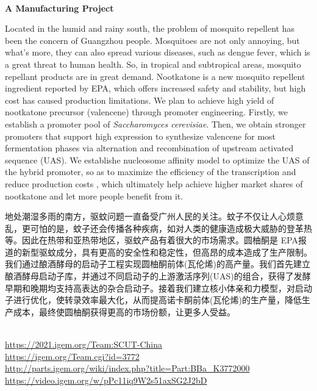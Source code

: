 \textbf{\\A Manufacturing Project\\}\begin{spacing}{1.5}

Located in the humid and rainy south, the problem of mosquito repellent has been the concern of Guangzhou people. Mosquitoes are not only annoying, but what's more, they can also spread various diseases, such as dengue fever, which is a great threat to human health. So, in tropical and subtropical areas, mosquito repellant products are in great demand. Nootkatone is a new mosquito repellent ingredient reported by EPA, which offers increased safety and stability, but high cost has caused production limitations. We plan to achieve high yield of nootkatone precursor (valencene) through promoter engineering. Firstly, we establish a promoter pool of \textit{Saccharomyces cerevisiae}. Then, we obtain stronger promoters that support high expression to synthesize valencene for most fermentation phases via alternation and recombination of upstream activated sequence (UAS). We establishe nucleosome affinity model to optimize the UAS of the hybrid promoter, so as to maximize the efficiency of the transcription and reduce production costs , which ultimately help achieve higher market shares of nootkatone and let more people benefit from it.

地处潮湿多雨的南方，驱蚊问题一直备受广州人民的关注。蚊子不仅让人心烦意乱，更可怕的是，蚊子还会传播各种疾病，如对人类的健康造成极大威胁的登革热等。因此在热带和亚热带地区，驱蚊产品有着很大的市场需求。圆柚酮是 EPA报道的新型驱蚊成分，具有更高的安全性和稳定性，但高昂的成本造成了生产限制。我们通过酿酒酵母的启动子工程实现圆柚酮前体(瓦伦烯)的高产量。我们首先建立酿酒酵母启动子库，并通过不同启动子的上游激活序列(UAS)的组合，获得了发酵早期和晚期均支持高表达的杂合启动子。接着我们建立核小体亲和力模型，对启动子进行优化，使转录效率最大化，从而提高诺卡酮前体(瓦伦烯)的生产量，降低生产成本，最终使圆柚酮获得更高的市场份额，让更多人受益。\end{spacing}
\\

\url{https://2021.igem.org/Team:SCUT-China }\\
\url{https://igem.org/Team.cgi?id=3772 }\\
\url{http://parts.igem.org/wiki/index.php?title=Part:BBa_K3772000 }\\
\url{https://video.igem.org/w/pPc11iq9W2s51axSG2J2bD }\\

\vfill{}









